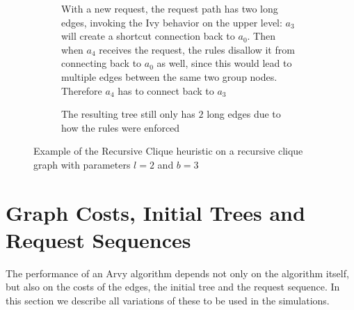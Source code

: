 \documentclass[a4paper, oneside]{discothesis}
\begin{document}
\begin{figure}[H]
\begin{subfigure}[t]{0.5\textwidth}
\begin{tikzpicture}
\end{tikzpicture}
\caption{With a new request, the request path has two long edges, invoking the Ivy behavior on the upper level: $a_{3}$ will create a shortcut connection back to $a_{0}$. Then when $a_{4}$ receives the request, the rules disallow it from connecting back to $a_{0}$ as well, since this would lead to multiple edges between the same two group nodes. Therefore $a_{4}$ has to connect back to $a_{3}$}
\end{subfigure}
\quad
\begin{subfigure}[t]{0.5\textwidth}
\centering
{}
\caption{The resulting tree still only has $2$ long edges due to how the rules were enforced}
\end{subfigure}
\caption{Example of the Recursive Clique heuristic on a recursive clique graph with parameters $l=2$ and $b=3$}
\label{fig:reclique-alg}
\end{figure}

\chapter{Graph Costs, Initial Trees and Request Sequences}

The performance of an Arvy algorithm depends not only on the algorithm itself, but also on the costs of the edges, the initial tree and the request sequence. In this section we describe all variations of these to be used in the simulations.
\end{document}
